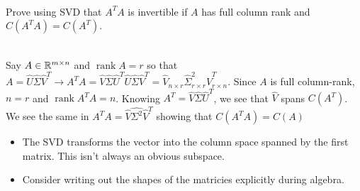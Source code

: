 \documentclass[11pt]{article}
\begin{document}
\begin{examplebox}[1.8]\quad\\
	\noindent Prove using SVD that $A^{T}A$ is invertible if $A$ has full column rank and $C(A^{T}A) = C(A^{T})$.\vspace{0.14cm}
\begin{solution}[1.8]\quad\\
	Say $A \in \mathbb{R}^{m \times n}$ and $\operatorname{rank} A = r$ so that $A = \hat{U} \hat{\Sigma} \hat{V}^{T} \to A^{T}A = \hat{V}\hat{\Sigma}\hat{U}^{T}\hat{U} \hat{\Sigma} \hat{V}^{T} = \hat{V}_{n \times r}\hat{\Sigma}^{2}_{r \times r}\hat{V}^{T}_{r \times n}$. Since $A$ is full column-rank, $n=r$ and $\operatorname{rank} A^{T}A=n$. Knowing $A^{T}= \hat{V} \hat{\Sigma} \hat{U}^{T}$, we see that $\hat{V}$ spans $C(A^{T})$. We see the same in $A^{T}A = \hat{V} \hat{\Sigma^{2}}\hat{V}^{T}$ showing that $C(A^{T}A) = C(A)$    
\end{solution}
\begin{takeaways}[1.8]\quad
    \begin{itemize}
		\item The SVD transforms the vector into the column space spanned by the first matrix. This isn't always an obvious subspace.
		\item Consider writing out the shapes of the matricies explicitly during algebra.
    \end{itemize}
\end{takeaways}
\end{examplebox}
\end{document}
